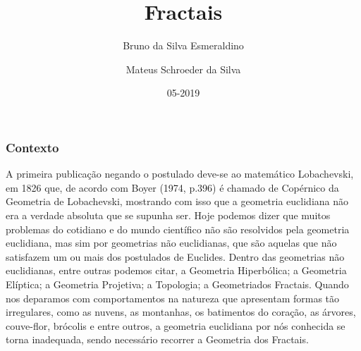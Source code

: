 \documentclass{beamer}
\title{Fractais}
\author[Bruno, Mateus]
{Bruno da Silva Esmeraldino  \and Mateus Schroeder da Silva}
\institute{UDESC}
\date{05-2019}
\begin{document}
 
\frame{\titlepage}
 

					
\begin{frame}
\frametitle{Contexto}
	A   primeira   publicação   negando   o   postulado   deve-se   ao   matemático Lobachevski,  em  1826  que,  de  acordo  com  Boyer  (1974,  p.396)  é  chamado  de Copérnico  da  Geometria  de  Lobachevski,  mostrando  com  isso  que  a  geometria euclidiana não era a verdade absoluta que se supunha ser. 
	Hoje  podemos  dizer  que  muitos  problemas  do  cotidiano  e  do  mundo científico não são resolvidos pela geometria euclidiana, mas sim por geometrias não euclidianas,  que  são  aquelas  que  não  satisfazem  um ou  mais  dos  postulados  de Euclides.  Dentro  das  geometrias  não  euclidianas,  entre  outras  podemos  citar,  a Geometria  Hiperbólica;  a  Geometria  Elíptica;  a  Geometria  Projetiva;  a  Topologia;  a Geometriados Fractais. 	Quando nos deparamos com comportamentos na natureza que apresentam formas  tão  irregulares,  como  as  nuvens,  as  montanhas,  os  batimentos  do  coração, as  árvores,  couve-flor,  brócolis  e  entre  outros,  a geometria  euclidiana  por  nós conhecida   se   torna   inadequada,   sendo   necessário   recorrer   a   Geometria   dos Fractais.
\end{frame}
\end{document}
